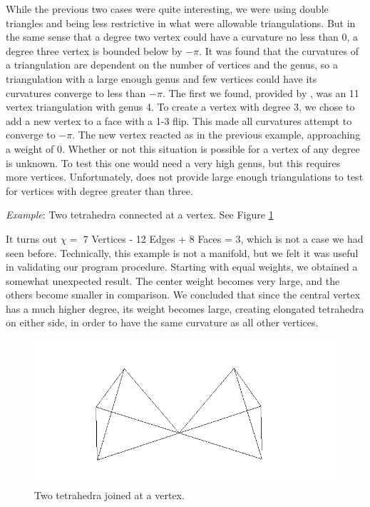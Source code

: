 \documentclass[12pt]{article}
\begin{document}
\noindent While the previous two cases were quite interesting, we were using double triangles and being less restrictive in what were allowable triangulations. But in the same sense that a degree two vertex could have a curvature no less than 0, a degree three vertex is bounded below by $-\pi$. It was found that the curvatures of a triangulation are dependent on the number of vertices and the genus, so a triangulation with a large enough genus and few vertices could have its curvatures converge to less than $-\pi$. The first we found, provided by \cite{lutzmanifold}, was an 11 vertex triangulation with genus 4. To create a vertex with degree 3, we chose to add a new vertex to a face with a 1-3 flip. This made all curvatures attempt to converge to $-\pi$. The new vertex reacted as in the previous example, approaching a weight of 0. Whether or not this situation is possible for a vertex of any degree is unknown. To test this one would need a very high genus, but this requires more vertices. Unfortunately, \cite{lutzmanifold} does not provide large enough triangulations to test for vertices with degree greater than three.\newline

\noindent \textit{Example}: Two tetrahedra connected at a vertex. See Figure \ref{fig:tt}\newline

\noindent It turns out $\chi = $ 7 Vertices - 12 Edges + 8 Faces = 3, which is not a case we had seen before. Technically, this example is not a manifold, but we felt it was useful in validating our program procedure. Starting with equal weights, we obtained a somewhat unexpected result. The center weight becomes very large, and the others become smaller in comparison. We concluded that since the central vertex has a much higher degree, its weight becomes large, creating elongated tetrahedra on either side, in order to have the same curvature as all other vertices.

\begin{figure}
\includegraphics{Pictures/tetratouch.png}
\caption{Two tetrahedra joined at a vertex.}
\label{fig:tt}
\end{figure}
\end{document}
